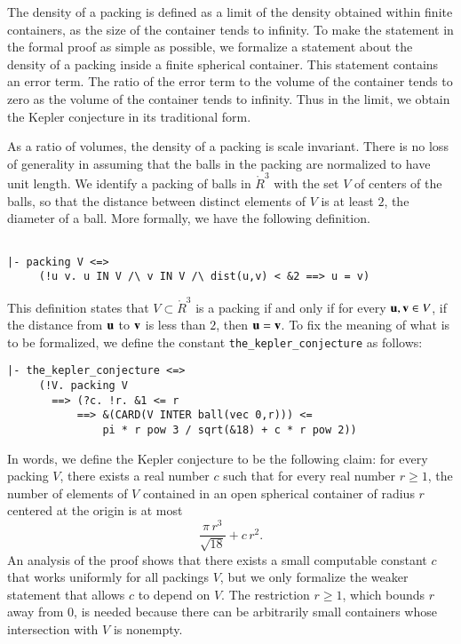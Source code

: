 The density of a packing is defined as a limit of the density obtained
within finite containers, as the size of the container tends to
infinity.  To make the statement in the formal proof as simple as
possible, we formalize a statement about the density of a packing
inside a finite spherical container.  This statement contains an error
term.  The ratio of the error term to the volume of the container
tends to zero as the volume of the container tends to infinity.  Thus
in the limit, we obtain the Kepler conjecture in its traditional form.

As a ratio of volumes, the density of a packing is scale invariant.
There is no loss of generality in assuming that the balls in the
packing are normalized to have unit length.  We identify a packing of
balls in $\ring{R}^3$ with the set $V$ of centers of the balls, so
that the distance between distinct elements of $V$ is at least $2$,
the diameter of a ball.  More formally, we have the following
definition.

\begin{obeylines}

\begin{verbatim}

|- packing V <=> 
     (!u v. u IN V /\ v IN V /\ dist(u,v) < &2 ==> u = v)

\end{verbatim}
\end{obeylines}
This definition states that $V\subset \ring{R}^3$ is a packing if and
only if for every ${\mathbf u}, {\mathbf v} \in V$, if the distance from ${\mathbf u}$ to ${\mathbf v}$ is
less than $2$, then ${\mathbf u}={\mathbf v}$.  To fix the meaning of what is to be
formalized, we define the constant {\tt the\_kepler\_conjecture} as
follows:
\begin{obeylines}

\begin{verbatim}
|- the_kepler_conjecture <=>
     (!V. packing V
       ==> (?c. !r. &1 <= r
           ==> &(CARD(V INTER ball(vec 0,r))) <=
               pi * r pow 3 / sqrt(&18) + c * r pow 2))
\end{verbatim}
\end{obeylines}
\noindent
In words, we define the Kepler conjecture to be the following claim:
for every packing $V$, there exists a real number $c$ such that for
every real number $r\ge 1$, the number of elements of $V$ contained in an
open spherical container of radius $r$ centered at the origin is at
most
\[
  \frac{\pi\, r^3}{\sqrt{18}} + c\, r^2.
\]
An analysis of the proof shows that there exists a
small computable constant $c$ that works uniformly for all packings
$V$, but we only formalize the weaker statement that allows $c$ to
depend on $V$.  The restriction $r\ge 1$, which bounds $r$ away from
$0$, is needed because there can be arbitrarily small containers whose
intersection with $V$ is nonempty.

